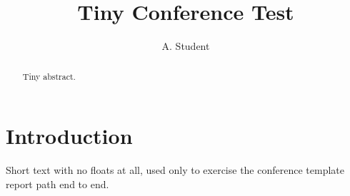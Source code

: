 \documentclass[10pt,letterpaper]{article}
\title{Tiny Conference Test}
\author{A. Student}
\begin{document}
\maketitle
\begin{abstract}Tiny abstract.\end{abstract}
\section{Introduction}
Short text with no floats at all, used only to exercise the conference
template report path end to end.
\end{document}
